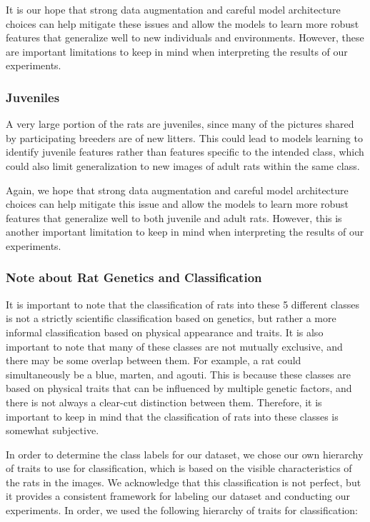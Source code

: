 \documentclass[conference]{IEEEtran}
\begin{document}
It is our hope that strong data augmentation and careful model architecture choices can help mitigate these issues and allow the models to learn more robust features that generalize well to new individuals and environments. However, these are important limitations to keep in mind when interpreting the results of our experiments.

\subsubsection{Juveniles}

A very large portion of the rats are juveniles, since many of the pictures shared by participating breeders are of new litters. This could lead to models learning to identify juvenile features rather than features specific to the intended class, which could also limit generalization to new images of adult rats within the same class.

Again, we hope that strong data augmentation and careful model architecture choices can help mitigate this issue and allow the models to learn more robust features that generalize well to both juvenile and adult rats. However, this is another important limitation to keep in mind when interpreting the results of our experiments.

\subsubsection{Note about Rat Genetics and Classification}

It is important to note that the classification of rats into these 5 different classes is not a strictly scientific classification based on genetics, but rather a more informal classification based on physical appearance and traits. It is also important to note that many of these classes are not mutually exclusive, and there may be some overlap between them. For example, a rat could simultaneously be a blue, marten, and agouti. This is because these classes are based on physical traits that can be influenced by multiple genetic factors, and there is not always a clear-cut distinction between them. Therefore, it is important to keep in mind that the classification of rats into these classes is somewhat subjective.

In order to determine the class labels for our dataset, we chose our own hierarchy of traits to use for classification, which is based on the visible characteristics of the rats in the images. We acknowledge that this classification is not perfect, but it provides a consistent framework for labeling our dataset and conducting our experiments. In order, we used the following hierarchy of traits for classification:
\end{document}
